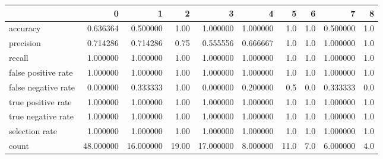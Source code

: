 \begin{tabular}{lrrrrrrrrr}
\toprule
{} &          0 &          1 &      2 &          3 &         4 &     5 &    6 &         7 &    8 \\
\midrule
accuracy            &   0.636364 &   0.500000 &   1.00 &   1.000000 &  1.000000 &   1.0 &  1.0 &  0.500000 &  1.0 \\
precision           &   0.714286 &   0.714286 &   0.75 &   0.555556 &  0.666667 &   1.0 &  1.0 &  1.000000 &  1.0 \\
recall              &   1.000000 &   1.000000 &   1.00 &   1.000000 &  1.000000 &   1.0 &  1.0 &  1.000000 &  1.0 \\
false positive rate &   1.000000 &   1.000000 &   1.00 &   1.000000 &  1.000000 &   1.0 &  1.0 &  1.000000 &  1.0 \\
false negative rate &   0.000000 &   0.333333 &   1.00 &   0.000000 &  0.200000 &   0.5 &  0.0 &  0.333333 &  0.0 \\
true positive rate  &   1.000000 &   1.000000 &   1.00 &   1.000000 &  1.000000 &   1.0 &  1.0 &  1.000000 &  1.0 \\
true negative rate  &   1.000000 &   1.000000 &   1.00 &   1.000000 &  1.000000 &   1.0 &  1.0 &  1.000000 &  1.0 \\
selection rate      &   1.000000 &   1.000000 &   1.00 &   1.000000 &  1.000000 &   1.0 &  1.0 &  1.000000 &  1.0 \\
count               &  48.000000 &  16.000000 &  19.00 &  17.000000 &  8.000000 &  11.0 &  7.0 &  6.000000 &  4.0 \\
\bottomrule
\end{tabular}

